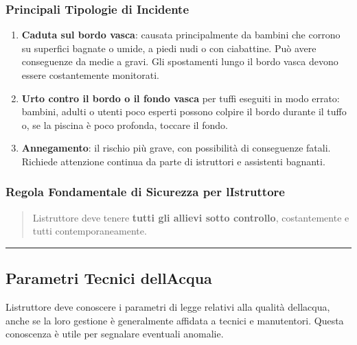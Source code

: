 \documentclass[a4paper,11pt]{article}
\begin{document}
\subsubsection{Principali Tipologie di
      Incidente}\label{principali-tipologie-di-incidente}

\begin{enumerate}
      \item
            \textbf{Caduta sul bordo vasca}: causata principalmente da bambini che
            corrono su superfici bagnate o umide, a piedi nudi o con ciabattine.
            Può avere conseguenze da medie a gravi. Gli spostamenti lungo il bordo
            vasca devono essere costantemente monitorati.
      \item
            \textbf{Urto contro il bordo o il fondo vasca} per tuffi eseguiti in
            modo errato: bambini, adulti o utenti poco esperti possono colpire il
            bordo durante il tuffo o, se la piscina è poco profonda, toccare il
            fondo.
      \item
            \textbf{Annegamento}: il rischio più grave, con possibilità di
            conseguenze fatali. Richiede attenzione continua da parte di
            istruttori e assistenti bagnanti.
\end{enumerate}

\subsubsection{Regola Fondamentale di Sicurezza per
      l\textquotesingle Istruttore}\label{regola-fondamentale-di-sicurezza-per-listruttore}

\begin{quote}
      L\textquotesingle istruttore deve tenere \textbf{tutti gli allievi sotto
            controllo}, costantemente e tutti contemporaneamente.
\end{quote}

\begin{center}\rule{0.5\linewidth}{0.5pt}\end{center}

\subsection{Parametri Tecnici
      dell\textquotesingle Acqua}\label{parametri-tecnici-dellacqua}

L\textquotesingle istruttore deve conoscere i parametri di legge
relativi alla qualità dell\textquotesingle acqua, anche se la loro
gestione è generalmente affidata a tecnici e manutentori. Questa
conoscenza è utile per segnalare eventuali anomalie.
\end{document}
